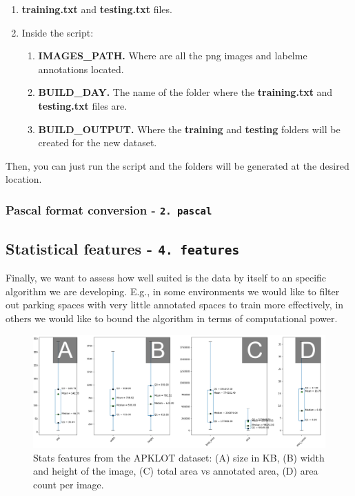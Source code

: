 \documentclass[]{article}
\providecommand{\tightlist}{%
  \setlength{\itemsep}{0pt}\setlength{\parskip}{0pt}}
\theoremstyle{definition}
\theoremstyle{definition}
\theoremstyle{definition}
\theoremstyle{remark}
\begin{document}
\begin{enumerate}
\def\labelenumi{\arabic{enumi}.}
\tightlist
\item
  \textbf{training.txt} and \textbf{testing.txt} files.
\item
  Inside the script:

  \begin{enumerate}
  \def\labelenumii{\arabic{enumii}.}
  \tightlist
  \item
    \textbf{IMAGES\_PATH.} Where are all the png images and labelme
    annotations located.
  \item
    \textbf{BUILD\_DAY.} The name of the folder where the
    \textbf{training.txt} and \textbf{testing.txt} files are.
  \item
    \textbf{BUILD\_OUTPUT.} Where the \textbf{training} and
    \textbf{testing} folders will be created for the new dataset.
  \end{enumerate}
\end{enumerate}

Then, you can just run the script and the folders will be generated at
the desired location.

\hypertarget{pascal-format-conversion---2.-pascal}{%
\subsubsection{\texorpdfstring{Pascal format conversion -
\texttt{2.\ pascal}}{Pascal format conversion - 2. pascal}}\label{pascal-format-conversion---2.-pascal}}

\hypertarget{statistical-features---4.-features}{%
\subsection{\texorpdfstring{Statistical features -
\texttt{4.\ features}}{Statistical features - 4. features}}\label{statistical-features---4.-features}}

Finally, we want to assess how well suited is the data by itself to an
specific algorithm we are developing. E.g., in some environments we
would like to filter out parking spaces with very little annotated
spaces to train more effectively, in others we would like to bound the
algorithm in terms of computational power.

\begin{figure}

{\centering \includegraphics[width=0.9\linewidth]{images/features} 

}

\caption{Stats features from the APKLOT dataset: (A) size in KB, (B) width and height of the image, (C) total area vs annotated area, (D) area count per image. }\label{fig:fig2}
\end{figure}
\end{document}
